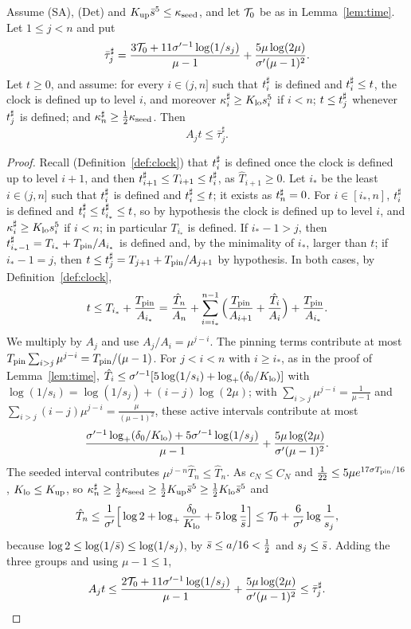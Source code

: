 \begin{lemma}
\label{lem:quiet-time}
Assume (SA), (Det) and $K_{\mathrm{up}}\bar s^5\le\kappa_{\mathrm{seed}}$, and let $\mathcal{T}_0$ be as
in Lemma~\ref{lem:time}. Let $1\le j<n$ and put
\[
\bar\tau^\sharp_j=\frac{3\mathcal{T}_0+11\sigma'^{-1}\log(1/s_j)}{\mu-1}+\frac{5\mu\log(2\mu)}{\sigma'(\mu-1)^2}.
\]
Let $t\ge0$, and assume: for every $i\in(j,n]$ such that $t^\sharp_i$ is defined and
$t^\sharp_i\le t$, the clock is defined up to level $i$, and moreover
$\kappa^\sharp_i\ge K_{\mathrm{lo}} s_i^5$ if $i<n$; $t\le t^\sharp_j$ whenever $t^\sharp_j$ is defined;
and $\kappa^\sharp_n\ge\frac12\kappa_{\mathrm{seed}}$. Then
\begin{equation}
\label{eq:relay-quiet-time}
A_jt\le\bar\tau^\sharp_j.
\end{equation}
\end{lemma}

\begin{proof}
Recall (Definition~\ref{def:clock}) that $t^\sharp_i$ is defined once the clock is
defined up to level $i+1$, and then $t^\sharp_{i+1}\le T_{i+1}\le t^\sharp_i$, as
$\hat T_{i+1}\ge0$. Let $i_*$ be the least $i\in(j,n]$ such that $t^\sharp_i$ is
defined and $t^\sharp_i\le t$; it exists as $t^\sharp_n=0$. For $i\in[i_*,n]$, $t^\sharp_i$ is
defined and $t^\sharp_i\le t^\sharp_{i_*}\le t$, so by hypothesis the clock is defined up to level $i$,
and $\kappa^\sharp_i\ge K_{\mathrm{lo}} s_i^5$ if $i<n$; in particular $T_{i_*}$ is defined. If
$i_*-1>j$, then $t^\sharp_{i_*-1}=T_{i_*}+T_{\mathrm{pin}}/A_{i_*}$ is defined and, by the
minimality of $i_*$, larger than $t$; if $i_*-1=j$, then
$t\le t^\sharp_j=T_{j+1}+T_{\mathrm{pin}}/A_{j+1}$ by hypothesis. In both cases, by
Definition~\ref{def:clock},
\[
t\le T_{i_*}+\frac{T_{\mathrm{pin}}}{A_{i_*}}=\frac{\hat T_n}{A_n}+\sum_{i=i_*}^{n-1}\Big(\frac{T_{\mathrm{pin}}}{A_{i+1}}+\frac{\hat T_i}{A_i}\Big)+\frac{T_{\mathrm{pin}}}{A_{i_*}}.
\]
We multiply by $A_j$ and use $A_j/A_i=\mu^{j-i}$. The pinning terms contribute at
most $T_{\mathrm{pin}}\sum_{i>j}\mu^{j-i}=T_{\mathrm{pin}}/(\mu-1)$. For $j<i<n$ with $i\ge i_*$, as in
the proof of Lemma~\ref{lem:time},
$\hat T_i\le\sigma'^{-1}[5\log(1/s_i)+\log_+(\delta_0/K_{\mathrm{lo}})]$ with
$\log(1/s_i)=\log(1/s_j)+(i-j)\log(2\mu)$; with $\sum_{i>j}\mu^{j-i}=\frac1{\mu-1}$
and $\sum_{i>j}(i-j)\mu^{j-i}=\frac\mu{(\mu-1)^2}$, these active intervals
contribute at most
\[
\frac{\sigma'^{-1}\log_+(\delta_0/K_{\mathrm{lo}})+5\sigma'^{-1}\log(1/s_j)}{\mu-1}+\frac{5\mu\log(2\mu)}{\sigma'(\mu-1)^2}.
\]
The seeded interval contributes $\mu^{j-n}\hat T_n\le\hat T_n$. As $c_N\le C_N$ and
$\frac1{22}\le5\mu e^{17\sigma T_{\mathrm{pin}}/16}$, $K_{\mathrm{lo}}\le K_{\mathrm{up}}$, so
$\kappa^\sharp_n\ge\frac12\kappa_{\mathrm{seed}}\ge\frac12K_{\mathrm{up}}\bar s^5\ge\frac12K_{\mathrm{lo}}\bar s^5$ and
\[
\hat T_n\le\frac1{\sigma'}\Big[\log2+\log_+\frac{\delta_0}{K_{\mathrm{lo}}}+5\log\frac1{\bar s}\Big]
\le\mathcal{T}_0+\frac{6}{\sigma'}\log\frac1{s_j},
\]
because $\log2\le\log(1/\bar s)\le\log(1/s_j)$, by $\bar s\le a/16<\frac12$ and
$s_j\le\bar s$. Adding the three groups and using $\mu-1\le1$,
\[
A_jt\le\frac{2\mathcal{T}_0+11\sigma'^{-1}\log(1/s_j)}{\mu-1}+\frac{5\mu\log(2\mu)}{\sigma'(\mu-1)^2}\le\bar\tau^\sharp_j .\qedhere
\]
\end{proof}
